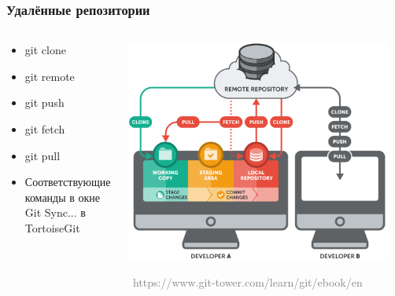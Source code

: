 \documentclass[xetex,mathserif,serif]{beamer}
\newcommand{\attribution}[1] {
    \vspace{-5mm}\begin{flushright}\begin{scriptsize}\textcolor{gray}{\textcopyright\, #1}\end{scriptsize}\end{flushright}
}
\begin{document}
    \begin{frame}
        \frametitle{Удалённые репозитории}
        \begin{columns}
            \begin{column}{0.4\textwidth}
                \begin{itemize}
                    \item git clone
                    \item git remote
                    \item git push
                    \item git fetch
                    \item git pull
                    \item Соответствующие команды в окне Git Sync... в TortoiseGit
                \end{itemize}
            \end{column}
            \begin{column}{0.6\textwidth}
                \begin{center}
                    \includegraphics[width=0.95\textwidth]{remoteRepos.png}
                    \attribution{https://www.git-tower.com/learn/git/ebook/en}
                \end{center}
            \end{column}
        \end{columns}
    \end{frame}
\end{document}
